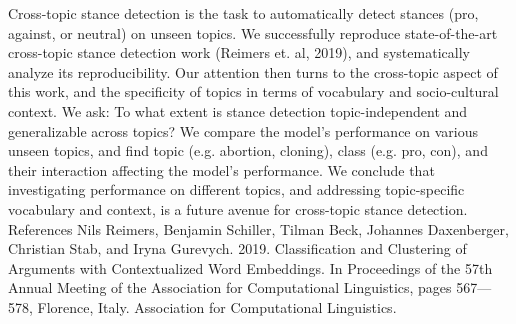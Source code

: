 Cross-topic stance detection is the task to automatically detect stances (pro, against, or neutral) on unseen topics. We successfully reproduce state-of-the-art cross-topic stance detection work (Reimers et. al, 2019), and systematically analyze its reproducibility. Our attention then turns to the cross-topic aspect of this work, and the specificity of topics in terms of vocabulary and socio-cultural context. We ask: To what extent is stance detection topic-independent and generalizable across topics? We compare the model's performance on various unseen topics, and find topic (e.g. abortion, cloning), class (e.g. pro, con), and their interaction affecting the model's performance. We conclude that investigating performance on different topics, and addressing topic-specific vocabulary and context, is a future avenue for cross-topic stance detection. References Nils  Reimers,  Benjamin  Schiller,  Tilman  Beck,  Johannes   Daxenberger,   Christian   Stab,   and   Iryna Gurevych.  2019.   Classification  and  Clustering  of Arguments with Contextualized Word Embeddings. In Proceedings of the 57th Annual Meeting of the Association for Computational Linguistics, pages 567---578, Florence, Italy. Association for Computational Linguistics.
